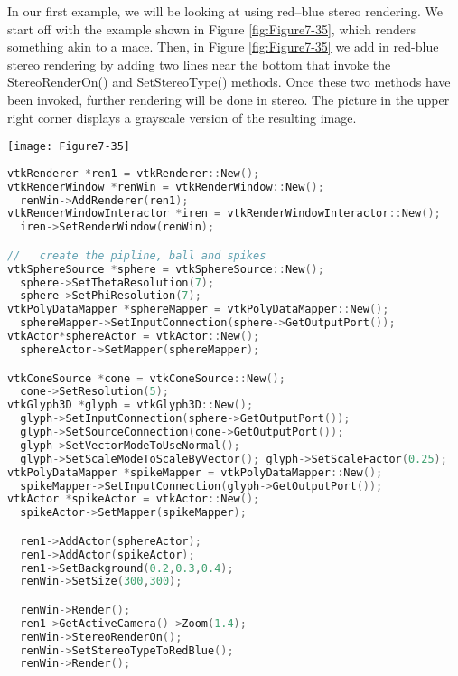 \begin{minipage}[b]{0.5\linewidth}
	In our first example, we will be looking at using red--blue stereo rendering. We start off with the example shown in Figure \ref{fig:Figure7-35}, which renders something akin to a mace. Then, in Figure \ref{fig:Figure7-35} we add in red-blue stereo rendering by adding two lines near the bottom that invoke the StereoRenderOn() and SetStereoType() methods. Once these two methods have been invoked, further rendering will be done in stereo. The picture in the upper right corner displays a grayscale version of the resulting image.
\end{minipage}
\hfill
\begin{minipage}[b]{0.4\linewidth}
	\centering
	\texttt{[image: Figure7-35]}
	\label{fig:Figure7-35}
\end{minipage}

\begin{lstlisting}[language=C++, caption={An example of red-blue stereo rendering.}]
vtkRenderer *ren1 = vtkRenderer::New();
vtkRenderWindow *renWin = vtkRenderWindow::New();
  renWin->AddRenderer(ren1);
vtkRenderWindowInteractor *iren = vtkRenderWindowInteractor::New();
  iren->SetRenderWindow(renWin);

//   create the pipline, ball and spikes
vtkSphereSource *sphere = vtkSphereSource::New();
  sphere->SetThetaResolution(7);
  sphere->SetPhiResolution(7);
vtkPolyDataMapper *sphereMapper = vtkPolyDataMapper::New();
  sphereMapper->SetInputConnection(sphere->GetOutputPort());
vtkActor*sphereActor = vtkActor::New();
  sphereActor->SetMapper(sphereMapper);

vtkConeSource *cone = vtkConeSource::New();
  cone->SetResolution(5);
vtkGlyph3D *glyph = vtkGlyph3D::New();
  glyph->SetInputConnection(sphere->GetOutputPort());
  glyph->SetSourceConnection(cone->GetOutputPort());
  glyph->SetVectorModeToUseNormal();
  glyph->SetScaleModeToScaleByVector(); glyph->SetScaleFactor(0.25);
vtkPolyDataMapper *spikeMapper = vtkPolyDataMapper::New();
  spikeMapper->SetInputConnection(glyph->GetOutputPort());
vtkActor *spikeActor = vtkActor::New();
  spikeActor->SetMapper(spikeMapper);

  ren1->AddActor(sphereActor);
  ren1->AddActor(spikeActor);
  ren1->SetBackground(0.2,0.3,0.4);
  renWin->SetSize(300,300);

  renWin->Render();
  ren1->GetActiveCamera()->Zoom(1.4);
  renWin->StereoRenderOn();
  renWin->SetStereoTypeToRedBlue();
  renWin->Render();
\end{lstlisting}

